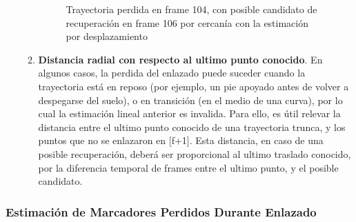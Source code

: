 \begin{itemize}
\begin{enumerate}
\begin{figure}[H]
\caption{Trayectoria perdida en frame 104, con posible candidato de recuperación en frame 106 por cercanía con la estimación por desplazamiento}
\label{inventario_trayectoria_direccional}
\end{figure} 
  
  \item \textbf{Distancia radial con respecto al ultimo punto conocido}. En algunos casos, la perdida del enlazado puede suceder cuando la trayectoria está en reposo (por ejemplo, un pie apoyado antes de volver a despegarse del suelo), o en transición (en el medio de una curva), por lo cual la estimación lineal anterior es invalida. Para ello, es útil relevar la distancia entre el ultimo punto conocido de una trayectoria trunca, y los puntos que no se enlazaron en [f+1]. Esta distancia, en caso de una posible recuperación, deberá ser proporcional al ultimo traslado conocido, por la diferencia temporal de frames entre el ultimo punto, y el posible candidato.
  
\end{enumerate} 

\end{itemize}

\subsubsection{Estimación de Marcadores Perdidos Durante Enlazado}

